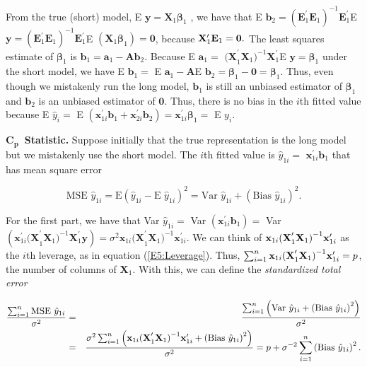From the true (short) model, E $\mathbf{y}=\mathbf{X}_{1}\boldsymbol \beta_{1}$%
, we have that E $\mathbf{b}_{2}=(\mathbf{E}_{1}^{\prime }\mathbf{E}%
_{1})^{-1}\mathbf{E}_{1}^{\prime }$E $\mathbf{y}=(\mathbf{E}_{1}^{\prime }%
\mathbf{E}_{1})^{-1}\mathbf{E}_{1}^{\prime }$E $(\mathbf{X}_{1}\mathbf{\beta
}_{1})=\mathbf{0}$, because $\mathbf{X}_{1}^{\prime }\mathbf{E}_{1}=\mathbf{%
0.}$  The least squares estimate of $\boldsymbol \beta_{1}$ is $\mathbf{b}_{1}=\mathbf{a%
}_{1}-\mathbf{Ab}_{2}$. Because E $\mathbf{a}_{1}=$
$\mathbf{(X}_{1}^{\prime
}\mathbf{X}_{1}\mathbf{)}^{-1}\mathbf{X}_{1}^{\prime }$E
$\mathbf{y}=\boldsymbol \beta_{1}$ under the short model, we have E $\mathbf{b}_{1}=$ E $\mathbf{a}%
_{1}-\mathbf{A}$E $\mathbf{b}_{2}=\boldsymbol
\beta_{1}-\mathbf{0}=\boldsymbol \beta_{1}$. Thus, even though we mistakenly run the long model, $\mathbf{b}%
_{1}$ is still an unbiased estimator of $\boldsymbol \beta_{1}$ and $\mathbf{b}%
_{2}$ is an unbiased estimator of $\mathbf{0}$. Thus, there is no
bias in
the $i$th fitted value because E $\hat{y}_{i}=$ E $(\mathbf{x}_{1i}^{\prime }%
\mathbf{b}_{1}+\mathbf{x}_{2i}^{\prime }\mathbf{b}_{2})=\mathbf{x}%
_{1i}^{\prime }\boldsymbol \beta_{1}=$ E $y_{i}$.

$\mathbf{C}_{\mathbf{p}}$\textbf{\ Statistic.} Suppose initially that the
true representation is the long model but we mistakenly use the short model.
The $i$th fitted value is $\hat{y}_{1i}=$ $\mathbf{x}_{1i}^{\prime }\mathbf{b%
}_{1}$ that has mean square error
\begin{center}
\[
\text{MSE }\hat{y}_{1i}=\text{E}(\hat{y}_{1i}-\text{E }\hat{y}_{1i})^{2}=%
\text{Var }\hat{y}_{1i}+\left( \text{Bias }\hat{y}_{1i}\right) ^{2}.
\]
\end{center}
For the first part, we have that Var $\hat{y}_{1i}=$ Var  $\left( \mathbf{x}%
_{1i}^{\prime }\mathbf{b}_{1}\right) =$ Var $\left( \mathbf{x}_{1i}^{\prime }%
\mathbf{(X}_{1}^{\prime }\mathbf{X}_{1}\mathbf{)}^{-1}\mathbf{X}_{1}^{\prime
}\mathbf{y}\right) =\sigma ^{2}\mathbf{x}_{1i}\mathbf{(X}_{1}^{\prime }%
\mathbf{X}_{1}\mathbf{)}^{-1}\mathbf{x}_{1i}^{\prime }$. We can think of $%
\mathbf{x}_{1i}\mathbf{(X}_{1}^{\prime }\mathbf{X}_{1}\mathbf{)}^{-1}\mathbf{%
x}_{1i}^{\prime }$ as the $i$th leverage, as in equation
(\ref{E5:Leverage}). Thus, $\sum_{i=1}^{n}\mathbf{x}_{1i}\mathbf{%
(X}_{1}^{\prime }\mathbf{X}_{1}\mathbf{)}^{-1}\mathbf{x}_{1i}^{\prime }=p$,
the number of columns of $\mathbf{X}_{1}$. With this, we can define the
\textit{standardized total error}

\begin{center}
\begin{eqnarray*}
\frac{\sum_{i=1}^{n}\text{MSE }\hat{y}_{1i}}{\sigma ^{2}} &=&\frac{%
\sum_{i=1}^{n}\left( \text{Var }\hat{y}_{1i}+\left( \text{Bias }\hat{y}%
_{1i}\right) ^{2}\right) }{\sigma ^{2}} \\
&=&\frac{\sigma ^{2}\sum_{i=1}^{n}\left( \mathbf{x}_{1i}\mathbf{(X}%
_{1}^{\prime }\mathbf{X}_{1}\mathbf{)}^{-1}\mathbf{x}_{1i}^{\prime }+\left(
\text{Bias }\hat{y}_{1i}\right) ^{2}\right) }{\sigma ^{2}}=p+\sigma
^{-2}\sum_{i=1}^{n}\left( \text{Bias }\hat{y}_{1i}\right) ^{2}.
\end{eqnarray*}
\end{center}

